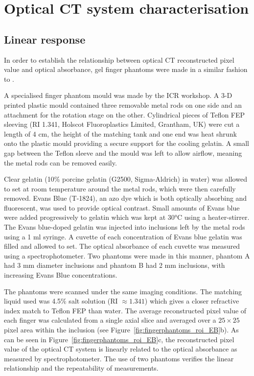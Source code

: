 \section{Optical CT system characterisation}

\subsection{Linear response}

In order to establish the relationship between optical CT reconstructed pixel value and optical absorbance,  gel finger phantoms were made in a similar fashion to \cite{Oldham:2003}.  


A specialised finger phantom mould was made by the ICR workshop. A 3-D printed plastic mould contained three removable metal rods on one side and an attachment for the rotation stage on the other. 
Cylindrical pieces of Teflon FEP sleeving (RI 1.341, Holscot Fluoroplastics Limited, Grantham, UK) were cut a length of 4 cm, the height of the matching tank and one end was heat shrunk onto the plastic mould providing a secure support for the cooling gelatin. A small gap between the Teflon sleeve and the mould was left to allow airflow, meaning the metal rods can be removed easily. 

 
Clear gelatin (10\% porcine gelatin (G2500, Sigma-Aldrich) in water) was allowed to set at room temperature around the metal rods, which  were then carefully removed.  Evans Blue (T-1824), an azo dye which is both optically absorbing and  fluorescent, was used to provide optical contrast. Small amounts of Evans blue were added progressively to gelatin which was kept at 30\si{\degreeCelsius} using a heater-stirrer. The Evans blue-doped gelatin was injected into inclusions left by the metal rods using a 1 \si{\ml} syringe. A cuvette of each concentration of Evans blue gelatin  was filled and allowed to set. The optical absorbance of each cuvette was measured using a spectrophotometer. Two phantoms were made in this manner, phantom A had 3 mm diameter inclusions and phantom B had 2 mm inclusions, with increasing Evans Blue concentrations.

The phantoms were scanned under the same imaging conditions. The matching liquid used was 4.5\% salt solution (RI $\approx 1.341$) which  gives a closer refractive index  match to Teflon FEP than water. The average reconstructed pixel value of each finger was calculated from a single axial slice and averaged over a $25 \times 25$ pixel area within the inclusion (see Figure~\ref{fig:fingerphantoms_roi_EB}b).
As can be seen in Figure~\ref{fig:fingerphantoms_roi_EB}c, the reconstructed pixel value of the optical CT system is linearly related to the optical absorbance as measured by  spectrophotometer.   The use of two phantoms verifies the linear relationship and the repeatability of measurements.  


